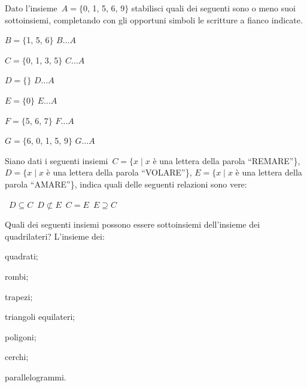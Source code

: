 \begin{esercizio}
\label{ese:\thechapter.43}
Dato l'insieme~$A=\{$0, 1, 5, 6, 9$\}$ stabilisci
quali dei seguenti sono o meno suoi sottoinsiemi, completando con gli
opportuni simboli le scritture a fianco indicate.
\begin{multicols}{2}
\TabPositions{3cm}
\begin{enumeratea}
\item $B=\{$1, 5, 6$\}$ \tab $B\ldots A$
\item $C=\{$0, 1, 3, 5$\}$ \tab $C \ldots A$
\item $D=\{ \}$ \tab $D \ldots A$
\item $E=\{0\}$ \tab $E \ldots A$
\item $F=\{$5, 6, 7$\}$ \tab $F \ldots A$
\item $G=\{$6, 0, 1, 5, 9$\}$ \tab $G\ldots A$
\end{enumeratea}
\end{multicols}
\end{esercizio}

\begin{esercizio}
\label{ese:\thechapter.44}
Siano dati i seguenti insiemi~$C=\{x\mid x$ è una lettera della parola ``REMARE''\}, $D=\{x\mid x$ è una lettera della parola ``VOLARE''\},
$E=\{x\mid x$ è una lettera della parola ``AMARE''\},
indica quali delle seguenti relazioni sono vere:
\begin{center}
\boxA\quad~$D\subseteq C$\quad\boxB\quad~$D\not\subset E$\quad\boxC\quad~$C=E$\quad\boxD\quad~$E\supseteq C$
\end{center}
\end{esercizio}

\begin{esercizio}
\label{ese:\thechapter.45}
Quali dei seguenti insiemi possono essere sottoinsiemi dell'insieme dei quadrilateri?
L'insieme dei:
\begin{multicols}{3}
\begin{enumeratea}
 \item quadrati;
 \item rombi;
 \item trapezi;
 \item triangoli equilateri;
 \item poligoni;
 \item cerchi;
 \item parallelogrammi.
\end{enumeratea}
\end{multicols}
\end{esercizio}

